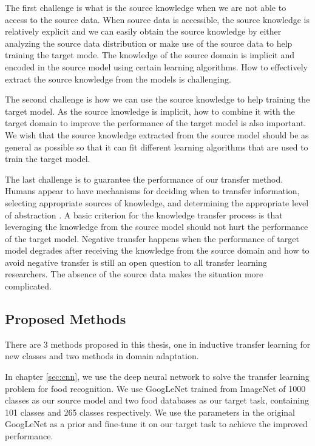 The first challenge is what is the source knowledge when we are not able to access to the source data. When source data is accessible, the source knowledge is relatively explicit and we can easily obtain the source knowledge by either analyzing the source data distribution or make use of the source data to help training the target mode. The knowledge of the source domain is implicit and encoded in the source model using certain learning algorithms. How to effectively extract the source knowledge from the models is challenging.

The second challenge is how we can use the source knowledge to help training the target model. As the source knowledge is implicit, how to combine it with the target domain to improve the performance of the target model is also important. We wish that the source knowledge extracted from the source model should be as general as possible so that it can fit different learning algorithms that are used to train the target model. 

The last challenge is to guarantee the performance of our transfer method. 
Humans appear to have mechanisms for deciding when to transfer information, selecting appropriate sources of knowledge, and determining the appropriate level of abstraction \cite{torrey2009transfer}. 
A basic criterion for the knowledge transfer process is that leveraging the knowledge from the source model should not hurt the performance of the target model. Negative transfer \cite{pan2010survey} happens when the performance of target model degrades after receiving the knowledge from the source domain and how to avoid negative transfer is still an open question to all transfer learning researchers. The absence of the source data makes the situation more complicated.

\subsection{Proposed Methods}
There are 3 methods proposed in this thesis, one in inductive transfer learning for new classes and two methods in domain adaptation.

In chapter \ref{sec:cnn}, we use the deep neural network to solve the transfer learning problem for food recognition. We use GoogLeNet trained from ImageNet of 1000 classes as our source model and two food databases as our target task, containing 101 classes and 265 classes respectively. We use the parameters in the original GoogLeNet as a prior and fine-tune it on our target task to achieve the improved performance.

